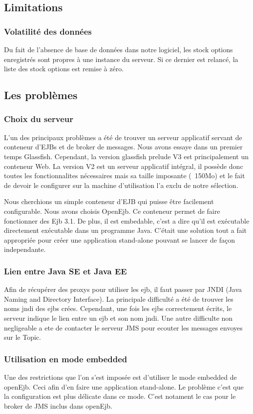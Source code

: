 \subsection{Limitations}
\subsubsection{Volatilité des données}
Du fait de l'absence de base de données dans notre logiciel, les stock options enregistrés sont propres à une instance du serveur. Si ce dernier est relancé, la liste des stock options est remise à zéro.
\subsection{Les problèmes}
\subsubsection{Choix du serveur}
L'un des principaux problèmes a été de trouver un serveur applicatif servant de conteneur d'EJBs et de broker de messages. Nous avons essaye dans un premier temps Glassfish. Cependant, la version glassfish prelude V3 est principalement un conteneur Web. La version V2 est un serveur applicatif intégral, il possède donc toutes les fonctionnalites nécessaires mais sa taille imposante (~150Mo) et le fait de devoir le configurer sur la machine d'utilisation l'a exclu de notre sélection.

Nous cherchions un simple conteneur d'EJB qui puisse être facilement configurable. Nous avons choisis OpenEjb. Ce conteneur permet de faire fonctionner des Ejb 3.1. De plus, il est embedable, c'est a dire qu'il est exécutable directement exécutable dans un programme Java. C'était une solution tout a fait appropriée pour créer une application stand-alone pouvant se lancer de façon independante.
\subsubsection{Lien entre Java SE et Java EE}
Afin de récupérer des proxys pour utiliser les ejb, il faut passer par JNDI (Java Naming and Directory Interface). La principale difficulté a été de trouver les noms jndi des ejbs crées. Cependant, une fois les ejbs correctement écrits, le serveur indique le lien entre un ejb et son nom jndi. Une autre difficulte non negligeable a ete de contacter le serveur JMS pour ecouter les messages envoyes sur le Topic.
\subsubsection{Utilisation en mode embedded}
Une des restrictions que l'on s'est imposée est d'utiliser le mode embedded de openEjb. Ceci afin d'en faire une application stand-alone. Le problème c'est que la configuration est plus délicate dans ce mode. C'est notament le cas pour le broker de JMS inclus dans openEjb.
